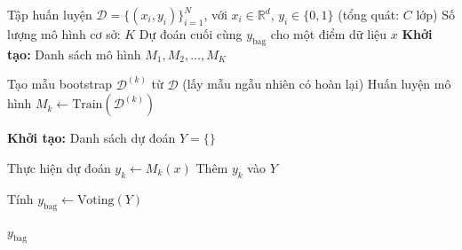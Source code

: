 \begin{algorithm}[htbp]
\caption{Bagging: Bootstrap Aggregating}
\label{bagging_ag1}
\begin{algorithmic}[1]
\Require Tập huấn luyện $\mathcal{D} = \{(x_i, y_i)\}_{i=1}^N$, với $x_i \in \mathbb{R}^d$, $y_i \in \{0, 1\}$ (tổng quát: $C$ lớp)
\Statex \qquad Số lượng mô hình cơ sở: $K$
\Ensure Dự đoán cuối cùng $y_{\text{bag}}$ cho một điểm dữ liệu $x$
\State \textbf{Khởi tạo:} Danh sách mô hình $M_1, M_2, \dots, M_K$

  \State Tạo mẫu bootstrap $\mathcal{D}^{(k)}$ từ $\mathcal{D}$ (lấy mẫu ngẫu nhiên có hoàn lại)
  \State Huấn luyện mô hình $M_k \gets \text{Train}(\mathcal{D}^{(k)})$
\EndFor

\State \textbf{Khởi tạo:} Danh sách dự đoán $Y = \{\}$

  \State Thực hiện dự đoán $y_k \gets M_k(x)$
  \State Thêm $y_k$ vào $Y$
\EndFor

\State Tính $y_{\text{bag}} \gets \text{Voting}(Y)$ 

\State \Return $y_{\text{bag}}$
\end{algorithmic}
\end{algorithm}

\pagebreak
